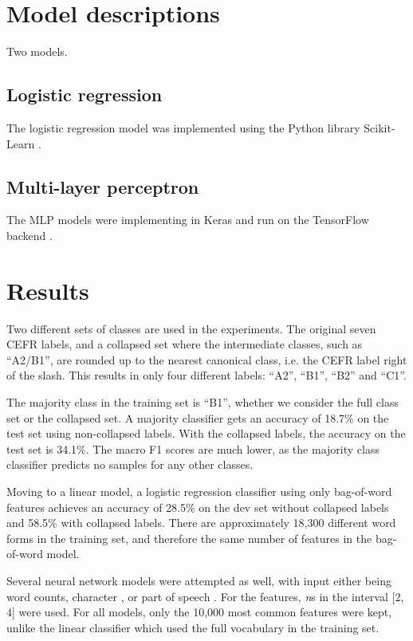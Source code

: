 \section{Model descriptions}

Two models.

\subsection{Logistic regression}

The logistic regression model was implemented using the Python
library Scikit-Learn \autocite{scikit-learn}.

\subsection{Multi-layer perceptron}

The MLP models were implementing in Keras \autocite{keras} and run on the TensorFlow
backend \autocite{tensorflow}.

\section{Results}

Two different sets of classes are used in the experiments. The original seven
CEFR labels, and a collapsed set where the intermediate classes, such as
``A2/B1'', are rounded up to the nearest canonical class, i.e. the CEFR label
right of the slash. This results in only four different labels: ``A2'',
``B1'', ``B2'' and ``C1''.

The majority class in the training set is ``B1'', whether we consider the
full class set or the collapsed set. A majority classifier gets an
accuracy of 18.7\% on the test set using non-collapsed labels. With the
collapsed labels, the accuracy on the test set is 34.1\%. The macro F1
scores are much lower, as the majority class classifier predicts no
samples for any other classes.

Moving to a linear model, a logistic regression classifier using only
bag-of-word features achieves an accuracy of 28.5\% on the dev set without
collapsed labels and 58.5\% with collapsed labels. There are approximately
18,300 different word forms in the training set, and therefore the same
number of features in the bag-of-word model.

Several neural network models were attempted as well, with input either being
word counts, character \ngrams, or part of speech \ngrams. For the \ngram
features, \textit{n}s in the interval [2, 4] were used. For all models, only
the 10,000 most common features were kept, unlike the linear classifier which
used the full vocabulary in the training set.

